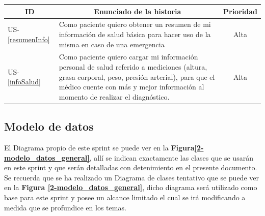 \documentclass[a4paper,12pt]{article}
\begin{document}
\begin{table}[h]
    \centering
	\begin{tabular}{|l|p{9cm}|c|}
	\hline
        \multicolumn{1}{|c|}{\textbf{ID}} &
        \multicolumn{1}{|c|}{\textbf{Enunciado de la historia}} &
        \textbf{Prioridad} \\          
    \hline
        US-\ref{resumenInfo} &
        Como paciente quiero obtener un resumen de mi información de salud básica para hacer uso de la misma en caso de una emergencia &Alta
        \\
    \hline 
	    US-\ref{infoSalud} &
        Como paciente quiero cargar mi información personal de salud referido a mediciones (altura, grasa corporal, peso, presión arterial), para que el médico cuente con más y mejor información al momento de realizar el diagnóstico. & Alta
        \\
    \hline
    \end{tabular}
    \label{US-Sprint2}
\end{table}

\subsection{Modelo de datos}
El Diagrama propio de este sprint se puede ver en la \textbf{Figura\ref{2-modelo_datos_general}}, allí se indican exactamente las clases que se usarán en este sprint y que serán detalladas con detenimiento en el presente documento. Se recuerda que se ha realizado un Diagrama de clases tentativo que se puede ver en la \textbf{Figura \ref{2-modelo_datos_general}}, dicho diagrama  será utilizado como base para este sprint y posee un alcance limitado el cual se irá modificando a medida que se profundice en los temas.
\end{document}
